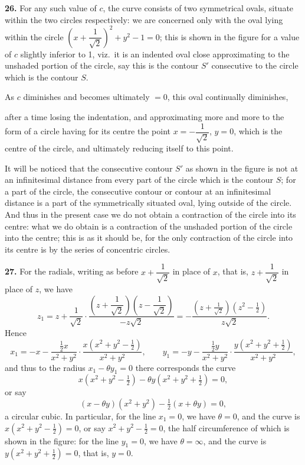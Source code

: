 \documentclass[11pt,a4paper]{article}
\begin{document}
\textbf{26.} For any such value of $c$, the curve consists of two symmetrical ovals, situate within the two circles respectively: we are concerned only with the oval lying within the circle $\left(x + \dfrac{1}{\sqrt{2}}\right)^2 + y^2 - 1 = 0$; this is shown in the figure for a value of $c$ slightly inferior to 1, viz.\ it is an indented oval close approximating to the unshaded portion of the circle, say this is the contour $S'$ consecutive to the circle which is the contour $S$.

As $c$ diminishes and becomes ultimately $= 0$, this oval continually diminishes,

after a time losing the indentation, and approximating more and more to the form of a circle having for its centre the point $x = -\dfrac{1}{\sqrt{2}}$, $y = 0$, which is the centre of the circle, and ultimately reducing itself to this point.

It will be noticed that the consecutive contour $S'$ as shown in the figure is not at an infinitesimal distance from every part of the circle which is the contour $S$; for a part of the circle, the consecutive contour or contour at an infinitesimal distance is a part of the symmetrically situated oval, lying outside of the circle. And thus in the present case we do not obtain a contraction of the circle into its centre: what we do obtain is a contraction of the unshaded portion of the circle into the centre; this is as it should be, for the only contraction of the circle into its centre is by the series of concentric circles.

\textbf{27.} For the radials, writing as before $x + \dfrac{1}{\sqrt{2}}$ in place of $x$, that is, $z + \dfrac{1}{\sqrt{2}}$ in place of $z$, we have
\[
z_1 = z + \frac{1}{\sqrt{2}} \cdot \frac{\left(z + \dfrac{1}{\sqrt{2}}\right)\left(z - \dfrac{1}{\sqrt{2}}\right)}{-z\sqrt{2}} = -\frac{(z + \tfrac{1}{\sqrt{2}})(z^2 - \tfrac{1}{2})}{z\sqrt{2}}.
\]
Hence
\[
x_1 = -x - \frac{\tfrac{1}{2} x}{x^2 + y^2} \cdot \frac{x(x^2 + y^2 - \tfrac{1}{2})}{x^2 + y^2}, \qquad y_1 = -y - \frac{\tfrac{1}{2} y}{x^2 + y^2} \cdot \frac{y(x^2 + y^2 + \tfrac{1}{2})}{x^2 + y^2},
\]
and thus to the radius $x_1 - \theta y_1 = 0$ there corresponds the curve
\[
x(x^2 + y^2 - \tfrac{1}{2}) - \theta y(x^2 + y^2 + \tfrac{1}{2}) = 0,
\]
or say
\[
(x - \theta y)(x^2 + y^2) - \tfrac{1}{2}(x + \theta y) = 0,
\]
a circular cubic. In particular, for the line $x_1 = 0$, we have $\theta = 0$, and the curve is $x(x^2 + y^2 - \tfrac{1}{2}) = 0$, or say $x^2 + y^2 - \tfrac{1}{2} = 0$, the half circumference of which is shown in the figure: for the line $y_1 = 0$, we have $\theta = \infty$, and the curve is $y(x^2 + y^2 + \tfrac{1}{2}) = 0$, that is, $y = 0$.
\end{document}
